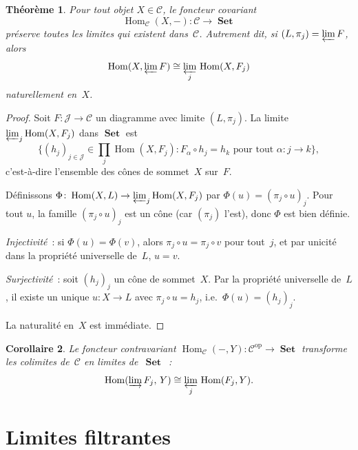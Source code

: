 \documentclass[a4paper,12pt]{book}
\DeclareMathOperator{\Hom}{Hom}
\DeclareMathOperator{\Set}{\mathbf{Set}}
\newcommand{\op}{\mathrm{op}}
\newtheorem{theoreme}{Théorème}[chapter]
\newtheorem{corollaire}[theoreme]{Corollaire}
\begin{document}
\begin{theoreme}\label{thm:hom-preserve-limites}
Pour tout objet $X\in\mathcal{C}$, le foncteur covariant
\[
    \Hom_{\mathcal{C}}(X,-)\colon\mathcal{C}\longrightarrow\Set
\]
préserve toutes les limites qui existent dans~$\mathcal{C}$.
Autrement dit, si $(L,\pi_j)=\varprojlim F$, alors
\[
    \Hom(X,\varprojlim F) \cong \varprojlim_j\, \Hom(X,F_j)
\]
naturellement en~$X$.
\end{theoreme}

\begin{proof}
Soit $F\colon\mathcal{J}\to\mathcal{C}$ un diagramme avec limite $(L,\pi_j)$.
La limite $\varprojlim_j\Hom(X,F_j)$ dans $\Set$ est
\[
    \bigl\{(h_j)_{j\in\mathcal{J}}\in\textstyle\prod_j\Hom(X,F_j)
    : F_\alpha\circ h_j = h_k \text{ pour tout } \alpha\colon j\to k\bigr\},
\]
c'est-à-dire l'ensemble des cônes de sommet~$X$ sur~$F$.

Définissons $\Phi\colon\Hom(X,L)\to\varprojlim_j\Hom(X,F_j)$ par
$\Phi(u)=(\pi_j\circ u)_j$. Pour tout $u$, la famille $(\pi_j\circ u)_j$
est un cône (car $(\pi_j)$ l'est), donc $\Phi$ est bien définie.

\emph{Injectivité}~: si $\Phi(u)=\Phi(v)$, alors $\pi_j\circ u=\pi_j\circ v$
pour tout~$j$, et par unicité dans la propriété universelle de~$L$, $u=v$.

\emph{Surjectivité}~: soit $(h_j)_j$ un cône de sommet~$X$.
Par la propriété universelle de~$L$, il existe un unique $u\colon X\to L$
avec $\pi_j\circ u = h_j$, i.e.\ $\Phi(u)=(h_j)_j$.

La naturalité en~$X$ est immédiate.
\end{proof}

\begin{corollaire}\label{cor:hom-contravariant-colimites}
Le foncteur contravariant $\Hom_{\mathcal{C}}(-,Y)\colon\mathcal{C}^{\op}\to\Set$
transforme les colimites de~$\mathcal{C}$ en limites de~$\Set$~:
\[
    \Hom(\varinjlim F_j,\, Y) \cong \varprojlim_j\, \Hom(F_j,Y).
\]
\end{corollaire}


\section{Limites filtrantes}\label{sec:limites-filtrantes}
\end{document}
